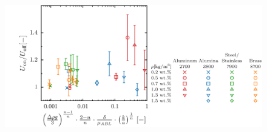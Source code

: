 \begin{figure}[ht]
    \centering
    \includegraphics[width=1.0\textwidth]{./5-Results/concentration/concentrationUdiffAll.png}
    \caption{}
    \label{fig:concentrationUdiffAll}
\end{figure}